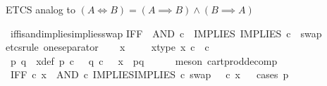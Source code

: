 \begin{isabellebody}
\endisatagproof
{\isafoldproof}%
%
\isadelimproof
%
\endisadelimproof
%
\begin{isamarkuptext}%
ETCS analog to $(A \iff B) = (A \implies B) \land (B \implies A)$%
\end{isamarkuptext}\isamarkuptrue%
\isamarkupfalse%
\ iff{\isacharunderscore}{\kern0pt}is{\isacharunderscore}{\kern0pt}and{\isacharunderscore}{\kern0pt}implies{\isacharunderscore}{\kern0pt}implies{\isacharunderscore}{\kern0pt}swap{\isacharcolon}{\kern0pt}\isanewline
{\isachardoublequoteopen}IFF\ {\isacharequal}{\kern0pt}\ AND\ {\isasymcirc}\isactrlsub c\ \ {\isasymlangle}IMPLIES{\isacharcomma}{\kern0pt}\ IMPLIES\ {\isasymcirc}\isactrlsub c\ \ swap\ {\isasymOmega}\ {\isasymOmega}{\isasymrangle}{\isachardoublequoteclose}\isanewline
%
\isadelimproof
%
\endisadelimproof
%
\isatagproof
{}\isamarkupfalse%
{\isacharparenleft}{\kern0pt}etcs{\isacharunderscore}{\kern0pt}rule\ one{\isacharunderscore}{\kern0pt}separator{\isacharparenright}{\kern0pt}\isanewline
\ \ \isamarkupfalse%
\ x\ \isanewline
\ \ \isamarkupfalse%
\ x{\isacharunderscore}{\kern0pt}type{\isacharcolon}{\kern0pt}\ {\isachardoublequoteopen}x\ {\isasymin}\isactrlsub c\ {\isasymOmega}\ {\isasymtimes}\isactrlsub c\ {\isasymOmega}{\isachardoublequoteclose}\isanewline
\ \ \isamarkupfalse%
\ \isamarkupfalse%
\ p\ q\ \ x{\isacharunderscore}{\kern0pt}def{\isacharcolon}{\kern0pt}\ {\isachardoublequoteopen}p\ {\isasymin}\isactrlsub c\ {\isasymOmega}\ {\isasymand}\ q\ {\isasymin}\isactrlsub c\ {\isasymOmega}\ {\isasymand}\ x\ {\isacharequal}{\kern0pt}\ {\isasymlangle}p{\isacharcomma}{\kern0pt}q{\isasymrangle}{\isachardoublequoteclose}\isanewline
\ \ \ \ \isamarkupfalse%
\ {\isacharparenleft}{\kern0pt}meson\ cart{\isacharunderscore}{\kern0pt}prod{\isacharunderscore}{\kern0pt}decomp{\isacharparenright}{\kern0pt}\isanewline
\ \ \isamarkupfalse%
\ {\isachardoublequoteopen}IFF\ {\isasymcirc}\isactrlsub c\ x\ {\isacharequal}{\kern0pt}\ {\isacharparenleft}{\kern0pt}AND\ {\isasymcirc}\isactrlsub c\ {\isasymlangle}IMPLIES{\isacharcomma}{\kern0pt}IMPLIES\ {\isasymcirc}\isactrlsub c\ swap\ {\isasymOmega}\ {\isasymOmega}{\isasymrangle}{\isacharparenright}{\kern0pt}\ {\isasymcirc}\isactrlsub c\ x{\isachardoublequoteclose}\isanewline
\ \ \isamarkupfalse%
{\isacharparenleft}{\kern0pt}cases\ {\isachardoublequoteopen}p\ {\isacharequal}{\kern0pt}\ {\isasymt}{\isachardoublequoteclose}{\isacharparenright}{\kern0pt}\isanewline

\end{isabellebody}
